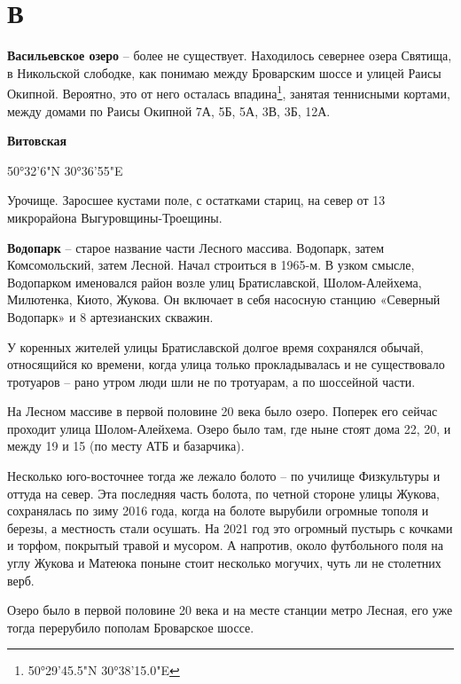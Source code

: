 \chapter*{В}

\textbf{Васильевское озеро} – более не существует. Находилось севернее озера Святища, в Никольской слободке, как понимаю между Броварским шоссе и улицей Раисы Окипной. Вероятно, это от него осталась впадина\footnote{50°29'45.5"N 30°38'15.0"E}, занятая теннисными кортами, между домами по Раисы Окипной 7А, 5Б, 5А, 3В, 3Б, 12А.\\

\medskip

\textbf{Витовская}

50°32'6"N 30°36'55"E

Урочище. Заросшее кустами поле, с остатками стариц, на север от 13 микрорайона Выгуров\-щины-Троещины.\\

\medskip

\textbf{Водопарк} – старое название части Лесного массива. Водопарк, затем Комсомольский, затем Лесной. Начал строиться в 1965-м. В узком смысле, Водопарком именовался район возле улиц Братиславской, Шолом-Алейхема, Милютенка, Киото, Жукова. Он включает в себя насосную станцию «Северный Водопарк» и 8 артезианских скважин.

У коренных жителей улицы Братиславской долгое время сохранялся обычай, относящийся ко времени, когда улица только прокладывалась и не существовало тротуаров – рано утром люди шли не по тротуарам, а по шоссейной части.

На Лесном массиве в первой половине 20 века было озеро. Поперек его сейчас проходит улица Шолом-Алейхема. Озеро было там, где ныне стоят дома 22, 20, и между 19 и 15 (по месту АТБ и базарчика).

Несколько юго-восточнее тогда же лежало болото – по училище Физкультуры и оттуда на север. Эта последняя часть болота, по четной стороне улицы Жукова, сохранялась по зиму 2016 года, когда на болоте вырубили огромные тополя и березы, а местность стали осушать. На 2021 год это огромный пустырь с кочками и торфом, покрытый травой и мусором. А напротив, около футбольного поля на углу Жукова и Матеюка поныне стоит несколько могучих, чуть ли не столетних верб.

Озеро было в первой половине 20 века и на месте станции метро Лесная, его уже тогда перерубило пополам Броварское шоссе.\\

